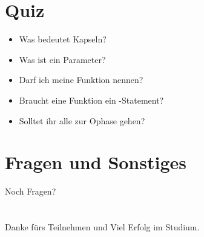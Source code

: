 \livecoding


\subsection{}

\section{Quiz}
\begin{frame}
	\slidehead
	\begin{itemize}
		\item Was bedeutet Kapseln?
		\pause
		\item Was ist ein Parameter?
		\pause
		\item Darf ich meine Funktion  nennen?
		\pause
		\item Braucht eine Funktion ein -Statement?
		\pause
		\item Solltet ihr alle zur Ophase gehen?
	\end{itemize}
\end{frame}

\section{Fragen und Sonstiges}
\begin{frame}
	\slidehead
	\vspace{1.8cm}
	\centering
	\huge Noch Fragen?
\end{frame}

\section{}
\subsection{}

\begin{frame}
	\slidehead
	\vspace{1.8cm}
	\centering
	\huge Danke fürs Teilnehmen und Viel Erfolg im Studium.
\end{frame}



